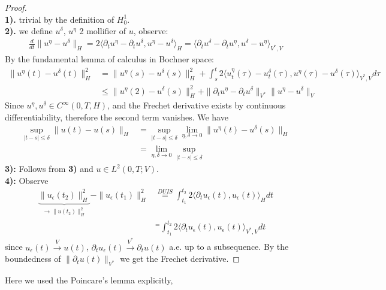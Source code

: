  \begin{proof}\quad\\
 \textbf{1).} trivial by the definition of $H^1_0$. \\
 \textbf{2).} we define $u^\delta$, $u^\eta$ 2 mollifier of $u$, observe:
 \begin{align*}
 	\frac{d}{dt}\|u^\eta - u^\delta\|_H = 2 \langle \partial_t u^\eta - \partial_t u^\delta, u^\eta - u^\delta \rangle_{H} = \langle \partial_tu^\delta - \partial_t u^\eta, u^\delta - u^\eta \rangle_{V^*, V}
 \end{align*}
 By the fundamental lemma of calculus in Bochner space:
 \begin{align*}
 	\|u^\eta(t) - u^\delta(t)\|_H^2 &= \|u^\eta(s) - u^\delta(s)\|_H^2 + \int_s^t 2 \langle u_t^\eta(\tau) - u_t^\delta(\tau), u^\eta(\tau) - u^\delta(\tau) \rangle_{V^*, V} d\tau\\
 	&\le \|u^\eta(2) - u^\delta(s)\|_H^2 + \|\partial_t u^\eta - \partial_t u^\delta \|_{V^*} \|u^\eta - u^\delta\|_V
 \end{align*}
 Since $u^\eta, u^\delta \in C^\infty(0, T, H)$, and the Frechet derivative exists by continuous differentiability, therefore the second term vanishes. We have
 \begin{align*}
 	\sup_{|t - s| \le \delta}\|u(t) - u(s)\|_H & = \sup_{|t - s| \le \delta} \lim_{\eta, \delta \rightarrow 0}\|u^\eta(t) - u^\delta(s)\|_H  \\
 	& = \lim_{\eta, \delta \rightarrow 0} \sup_{|t -s| \le \delta}
 \end{align*}
 \textbf{3):} Follows from \textbf{3)} and $u \in L^2(0, T; V)$.\\
 \textbf{4):} Observe 
 \begin{align*}
 	\underbrace{\|u_\epsilon(t_2)\|_H^2}_{\rightarrow \|u(t_2)\|^2_H} - \|u_\epsilon(t_1)\|_H^2 
 	&\overset{DUIS}{=} \int_{t_1}^{t_2} 2\langle \partial_t u_\epsilon(t), u_\epsilon(t) \rangle_H dt\\
 	& ^= \int_{t_1}^{t_2} 2 \langle \partial_t u_\epsilon(t), u_\epsilon(t) \rangle_{V^*,V} dt 
 \end{align*}
 since $u_\epsilon(t) \overset{V}{\rightarrow} u(t)$,  $\partial_t u_\epsilon(t) \overset{V^*}{\rightarrow}\partial_t u(t)$ a.e. up to a subsequence. By the boundedness of $\|\partial_t u(t)\|_{V^*}$ we get the Frechet derivative.  
 \end{proof}
 \begin{remark}
 Here we used the Poincare's lemma explicitly, 	
 \end{remark}

